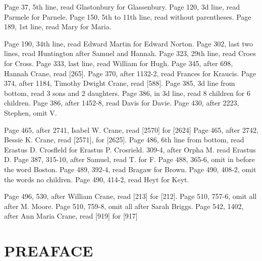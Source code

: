 \documentclass{book}
\begin{document}
Page 37, 5th line, read Glastonbury for Glassenbury.
Page 120, 3d line, read Parmele for Parnele.
Page 150, 5th to 11th line, read without parentheses.
Page 189, 1st line, read Mary for Maria.

Page 190, 34th line, read Edward Martin for Edward Norton.
Page 302, last two lines, read Huntington after Samuel and Hannah.
Page 323, 29th line, read Croes for Cross.
Page 333, last line, read William for Hugh.
Page 345, after 698, Hannah Crane, read [265].
Page 370, after 1132-2, read Frances for Kraucis.
Page 374, after 1184, Timothy Dwight Crane, read [588].
Page 385, 3d line from bottom, read 3 sons and 2 daughters.
Page 386, in 3d line, read 8 children for 6 children.
Page 386, after 1452-8, read Davis for Davie.
Page 430, after 2223, Stephen, omit V.

Page 465, after 2741, Isabel W. Crane, read [2570] for [2624]
Page 465, after 2742, Bessie K. Crane, read [2571], for [2625].
Page 486, 6th line from bottom, read Erastus D. Crosfleld for
Erastus P. Crosrield. 309-4, after Orpha M. read Erastus D.
Page 387, 315-10, after Samuel, read T. for F.
Page 488, 365-6, omit in before the word Boston.
Page 489, 392-4, read Bragaw for Brown.
Page 490, 408-2, omit the words no children.
Page 490, 414-2, read Heyt for Keyt.

Page 496, 530, after William Crane, read [213] for [212].
Page 510, 757-6, omit all after M. Moore.
Page 510, 759-8, omit all after Sarah Briggs.
Page 542, 1402, after Ann Maria Crane, read [919] for [917]



\section{PREAFACE}
\end{document}
